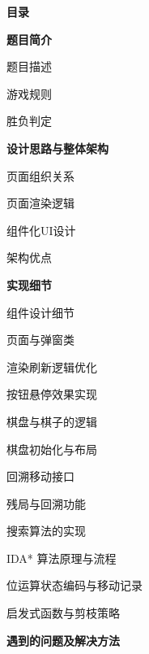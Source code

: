 \documentclass[12pt, a4paper]{article}
\begin{document}
\newpage
\setcounter{page}{1}
\begin{center}
    {\Large\bfseries\color{darkacademic} 目录}
\end{center}
\vspace{1cm}
\begin{mytoc}
    \item {\bfseries\color{academicblue} 题目简介}
    \begin{mytoc}
        \item 题目描述
        \item 游戏规则
        \item 胜负判定
    \end{mytoc}
    \item {\bfseries\color{academicblue} 设计思路与整体架构}
    \begin{mytoc}
        \item 页面组织关系
        \item 页面渲染逻辑
        \item 组件化UI设计
        \item 架构优点
    \end{mytoc}
    \item {\bfseries\color{academicblue} 实现细节}
    \begin{mytoc}
        \item 组件设计细节
        \item 页面与弹窗类
        \item 渲染刷新逻辑优化
        \item 按钮悬停效果实现
        \item 棋盘与棋子的逻辑
        \begin{mytoc}
            \item 棋盘初始化与布局
            \item 回溯移动接口
        \end{mytoc}
        \item 残局与回溯功能
        \item 搜索算法的实现
        \begin{mytoc}
            \item IDA* 算法原理与流程
            \item 位运算状态编码与移动记录
            \item 启发式函数与剪枝策略
        \end{mytoc}
    \end{mytoc}
    \item {\bfseries\color{academicblue} 遇到的问题及解决方法}
    \begin{mytoc}

\end{mytoc}
\end{mytoc}
\end{document}
